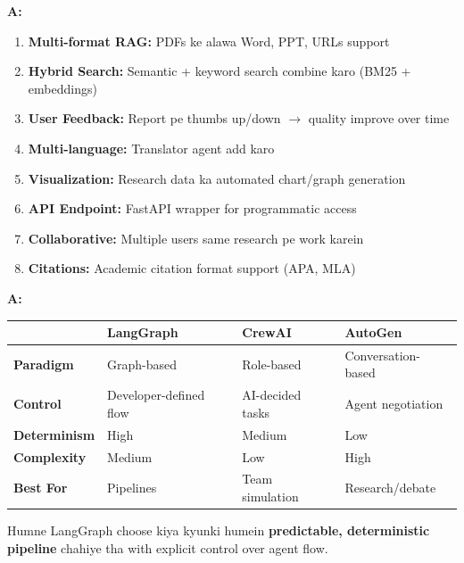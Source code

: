 \documentclass[12pt, a4paper]{article}
\begin{document}
\begin{interviewbox}[title={\faIcon{user-tie} ~Q47: Is project mein kya improvements kar sakte ho?}]
\textbf{A:}
\begin{enumerate}
\item \textbf{Multi-format RAG:} PDFs ke alawa Word, PPT, URLs support
\item \textbf{Hybrid Search:} Semantic + keyword search combine karo (BM25 + embeddings)
\item \textbf{User Feedback:} Report pe thumbs up/down $\rightarrow$ quality improve over time
\item \textbf{Multi-language:} Translator agent add karo
\item \textbf{Visualization:} Research data ka automated chart/graph generation
\item \textbf{API Endpoint:} FastAPI wrapper for programmatic access
\item \textbf{Collaborative:} Multiple users same research pe work karein
\item \textbf{Citations:} Academic citation format support (APA, MLA)
\end{enumerate}
\end{interviewbox}

\begin{interviewbox}[title={\faIcon{user-tie} ~Q48: LangGraph vs CrewAI vs AutoGen --- comparison?}]
\textbf{A:}
\begin{center}
\small
\begin{tabular}{|l|p{3.5cm}|p{3.5cm}|p{3.5cm}|}
\hline
\rowcolor{accentpurple!15}
& \textbf{LangGraph} & \textbf{CrewAI} & \textbf{AutoGen} \\
\hline
\textbf{Paradigm} & Graph-based & Role-based & Conversation-based \\
\hline
\textbf{Control} & Developer-defined flow & AI-decided tasks & Agent negotiation \\
\hline
\textbf{Determinism} & High & Medium & Low \\
\hline
\textbf{Complexity} & Medium & Low & High \\
\hline
\textbf{Best For} & Pipelines & Team simulation & Research/debate \\
\hline
\end{tabular}
\end{center}

Humne LangGraph choose kiya kyunki humein \textbf{predictable, deterministic pipeline} chahiye tha with explicit control over agent flow.
\end{interviewbox}
\end{document}
